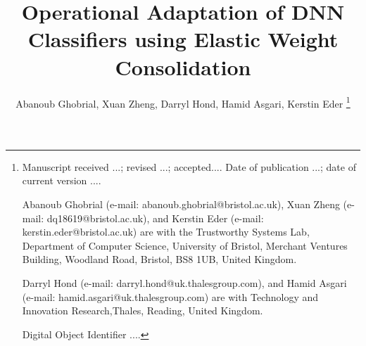 \documentclass[letterpaper, 10 pt, journal, twoside]{IEEEtran}
\begin{document}
\title{Operational Adaptation of DNN Classifiers using Elastic Weight Consolidation}

\author{Abanoub Ghobrial, Xuan Zheng, Darryl Hond, Hamid Asgari, Kerstin Eder 
\thanks{{\footnotesize
Manuscript  
received ...;
revised ...;  
accepted.... 
Date of publication ...;
date of current version ....



Abanoub Ghobrial (e-mail: abanoub.ghobrial@bristol.ac.uk), 
Xuan Zheng (e-mail: dq18619@bristol.ac.uk), 
and 
Kerstin Eder (e-mail: kerstin.eder@bristol.ac.uk) 
are with the Trustworthy Systems Lab, Department of Computer Science, University of Bristol, Merchant Ventures Building, Woodland Road, Bristol, BS8 1UB, United Kingdom. 

Darryl Hond (e-mail: darryl.hond@uk.thalesgroup.com),
and
Hamid Asgari (e-mail: hamid.asgari@uk.thalesgroup.com) 
are with Technology and Innovation Research,Thales, Reading, United Kingdom. 

Digital Object Identifier ....
}}}
%
%
\maketitle

\begin{abstract}
\noindent 

\end{abstract}
\end{document}
